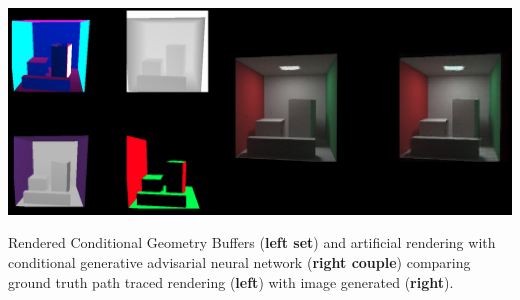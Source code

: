 \documentclass[sigconf,authordraft]{acmart}
\begin{document}

\begin{teaserfigure}
  \includegraphics[width=\textwidth]{buffers_results.png}
  \caption{\textmd{Rendered Conditional Geometry Buffers ({\bf left set}) and artificial rendering with conditional generative advisarial neural network ({\bf right couple}) comparing ground truth path traced rendering ({\bf left}) with image generated ({\bf right}).}}
  \label{teaser}
\end{teaserfigure}

\maketitle
\end{document}
